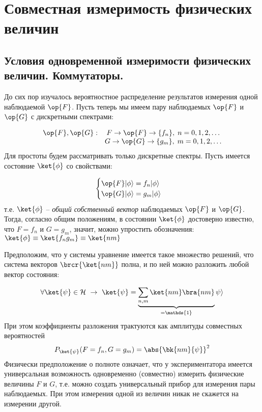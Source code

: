 \chapter{Совместная измеримость физических величин}

\section{Условия одновременной измеримости физических величин. Коммутаторы.}

До сих пор изучалось вероятностное распределение результатов измерения одной наблюдаемой $\op{F}$. Пусть теперь мы имеем пару наблюдаемых $\op{F}$ и $\op{G}$ с дискретными спектрами:

$$
\begin{array}{lcl}
\op{F}, \op{G}:  & F \rightarrow \op{F} \rightarrow \{f_n\}, \; n=0,1,2,\dots\\
                 & G \rightarrow \op{G} \rightarrow \{g_m\}, \; m=0,1,2,\dots
\end{array}
$$%
%
Для простоты будем рассматривать только дискретные спектры. Пусть имеется состояние $\ket{\phi}$ со свойствами:

\begin{equation}
\label{eq:4_1_1}
  \begin{cases}
    \op{F} |\phi \rangle = f_n |\phi \rangle\\
    \op{G} |\phi \rangle = g_m |\phi \rangle
  \end{cases} 
\end{equation}%
%
т.е. $\ket{\phi}$ -- {\em общий собственный вектор} наблюдаемых $\op{F}$ и $\op{G}$. Тогда, согласно общим положениям, в состоянии $\ket{\phi}$ достоверно известно, что $F = f_n$ и $G=g_m$, значит, можно упростить обозначения: $\ket{\phi} \equiv \ket{f_n g_m} \equiv \ket{nm}$

Предположим, что у системы уравнение имеется такое множество решений, что система векторов $\brcr{\ket{nm}}$ полна, и по ней можно разложить любой вектор состояния:

\begin{equation}
  \label{eq:4_1_2}
  \forall \ket{\psi} \in \mathcal{H} ~\rightarrow ~ \ket{\psi} =
      \underbrace{\sum_{n,m}\ket{nm}\bra{nm}}_{=\mathds{1}} \psi \rangle 
\end{equation}%
%
При этом коэффициенты разложения трактуются как амплитуды совместных вероятностей
$$
  P_{\ket{\psi}}(F = f_n, G = g_m) = \abs{\bk{nm}{\psi}}^2
$$%
%
Физически предположение о полноте означает, что у экспериментатора имеется универсальная возможность одновременно (совместно) измерить физические величины $F$ и $G$, т.е. можно создать универсальный прибор для измерения пары наблюдаемых. При этом измерения одной из величин никак не скажется на измерении другой.

